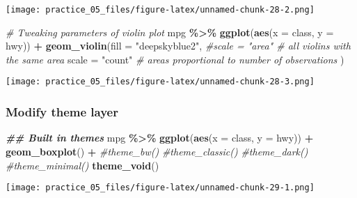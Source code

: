 \documentclass[
]{article}
\newenvironment{Shaded}{\begin{snugshade}}{\end{snugshade}}
\newcommand{\AttributeTok}[1]{\textcolor[rgb]{0.13,0.29,0.53}{#1}}
\newcommand{\CommentTok}[1]{\textcolor[rgb]{0.56,0.35,0.01}{\textit{#1}}}
\newcommand{\DocumentationTok}[1]{\textcolor[rgb]{0.56,0.35,0.01}{\textbf{\textit{#1}}}}
\newcommand{\FunctionTok}[1]{\textcolor[rgb]{0.13,0.29,0.53}{\textbf{#1}}}
\newcommand{\NormalTok}[1]{#1}
\newcommand{\SpecialCharTok}[1]{\textcolor[rgb]{0.81,0.36,0.00}{\textbf{#1}}}
\newcommand{\StringTok}[1]{\textcolor[rgb]{0.31,0.60,0.02}{#1}}
\begin{document}
\texttt{[image: practice\_05\_files/figure-latex/unnamed-chunk-28-2.png]}

\begin{Shaded}
\begin{Highlighting}[]
\CommentTok{\# Tweaking parameters of violin plot}
\NormalTok{mpg }\SpecialCharTok{\%\textgreater{}\%}
  \FunctionTok{ggplot}\NormalTok{(}\FunctionTok{aes}\NormalTok{(}\AttributeTok{x =}\NormalTok{ class,}
             \AttributeTok{y =}\NormalTok{ hwy)) }\SpecialCharTok{+}
  \FunctionTok{geom\_violin}\NormalTok{(}\AttributeTok{fill =} \StringTok{"deepskyblue2"}\NormalTok{, }
              \CommentTok{\#scale = "area"        \# all violins with the same area}
              \AttributeTok{scale =} \StringTok{"count"}        \CommentTok{\# areas proportional to number of observations}
\NormalTok{              )}
\end{Highlighting}
\end{Shaded}

\texttt{[image: practice\_05\_files/figure-latex/unnamed-chunk-28-3.png]}

\subsubsection{Modify theme layer}\label{modify-theme-layer}

\begin{Shaded}
\begin{Highlighting}[]
\DocumentationTok{\#\# Built in themes}
\NormalTok{mpg }\SpecialCharTok{\%\textgreater{}\%} 
  \FunctionTok{ggplot}\NormalTok{(}\FunctionTok{aes}\NormalTok{(}\AttributeTok{x =}\NormalTok{ class,}
             \AttributeTok{y =}\NormalTok{ hwy)) }\SpecialCharTok{+}
  \FunctionTok{geom\_boxplot}\NormalTok{() }\SpecialCharTok{+}
  \CommentTok{\#theme\_bw()}
  \CommentTok{\#theme\_classic()}
  \CommentTok{\#theme\_dark()}
  \CommentTok{\#theme\_minimal()}
  \FunctionTok{theme\_void}\NormalTok{()}
\end{Highlighting}
\end{Shaded}

\texttt{[image: practice\_05\_files/figure-latex/unnamed-chunk-29-1.png]}
\end{document}
